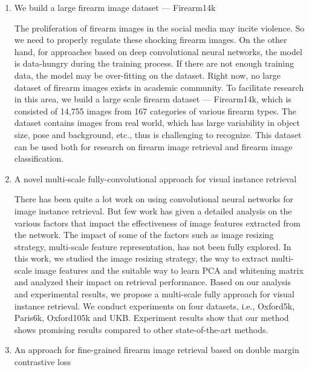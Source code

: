 \begin{enumerate}
\item We build a large firearm image dataset --- Firearm14k

The proliferation of firearm images in the social media may incite violence. So we need to properly regulate these shocking firearm images. On the other hand, for approaches based on deep convolutional neural networks, the model is data-hungry during the training process. If there are not enough training data, the model may be over-fitting on the dataset. Right now, no large dataset of firearm images exists in academic community. To facilitate research in this area, we build a large scale firearm dataset --- Firearm14k, which is consisted of 14,755 images from 167 categories of various firearm types. The dataset contains images from real world, which has large variability in object size, pose and background, etc., thus is challenging to recognize. This dataset can be used both for research on firearm image retrieval and firearm image classification.

\item A novel multi-scale fully-convolutional approach for visual instance retrieval

There has been quite a lot work on using convolutional neural networks for image instance retrieval. But few work has given a detailed analysis on the various factors that impact the effectiveness of image features extracted from the network. The impact of some of the factors such as image resizing strategy, multi-scale feature representation, has not been fully explored. In this work, we studied the image resizing strategy, the way to extract multi-scale image features and the suitable way to learn PCA and whitening matrix and analyzed their impact on retrieval performance. Based on our analysis and experimental results, we propose a multi-scale fully approach for visual instance retrieval. We conduct experiments on four datasets, i.e., Oxford5k, Paris6k, Oxford105k and UKB. Experiment results show that our method shows promising results compared to other state-of-the-art methods.

\item An approach for fine-grained firearm image retrieval based on double margin contrastive loss


\end{enumerate}
